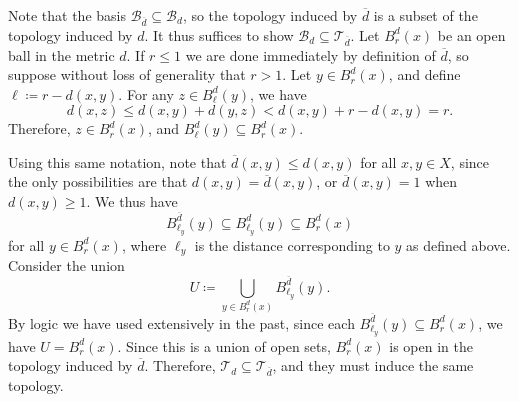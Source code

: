 \documentclass[11pt, letterpaper]{article}
\begin{document}
Note that the basis $\mathcal{B}_{\overline{d} } \subseteq \mathcal{B}_d$, so the topology induced by $\overline{d} $ is a subset of the topology induced by $d$. It thus suffices to show $\mathcal{B}_d \subseteq \mathcal{T}_{\overline{d} } $. Let $B_r^d(x)$ be an open ball in the metric $d$. If $r\leq 1$ we are done immediately by definition of $\overline{d} $, so suppose without loss of generality that $r>1$. Let $y\in B_r^d(x)$, and define $\ell \coloneqq r-d(x,y)$. For any $z\in B_\ell^d(y)$, we have
\[
	d(x,z)\leq d(x,y)+d(y,z)<d(x,y)+r-d(x,y)=r
.\]
Therefore, $z\in B_r^d(x)$, and $B_\ell ^d(y)\subseteq B_r^d(x)$.

Using this same notation, note that $\overline{d}(x,y)\leq d(x,y)$ for all $x,y\in X$, since the only possibilities are that $d(x,y)=\overline{d} (x,y)$, or $\overline{d}(x,y)=1$ when $d(x,y)\geq 1$. We thus have
\[
	B^{\overline{d} }_{\ell_y} (y)\subseteq B_{\ell _y}^d(y)\subseteq B_r^d(x)
\]
for all $y\in B_r^d(x)$, where $\ell_y$ is the distance corresponding to $y$ as defined above. Consider the union
\[
	U\coloneqq \bigcup_{y\in B_r^{d} (x)} B_{\ell_y}^{\overline{d} } (y)
.\]
By logic we have used extensively in the past, since each $B_{\ell _y}^{\overline{d} } (y)\subseteq B_r^{d} (x)$, we have $U=B_r^d(x)$. Since this is a union of open sets, $B_r^d(x)$ is open in the topology induced by $\overline{d} $. Therefore, $\mathcal{T}_d \subseteq  \mathcal{T}_{\overline{d} } $, and they must induce the same topology.
\end{document}
